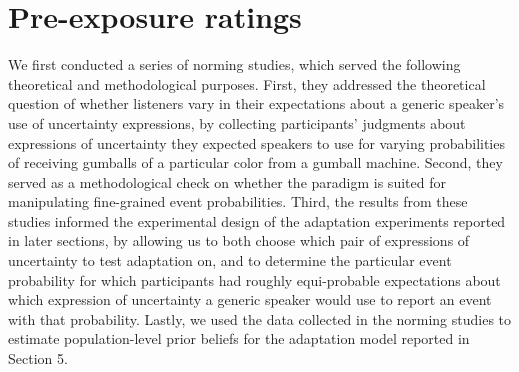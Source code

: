 \documentclass[lucida,biblatex]{sp} %
\newcommand{\sectionref}[1]{Section~\ref{#1}}
\begin{document}



\section{Pre-exposure ratings}
\label{sec:exp-norming}

We first conducted a series of norming studies, which served the following theoretical and methodological purposes.
First, they addressed the theoretical question of whether listeners vary in their expectations about
a generic speaker's use of uncertainty expressions, by collecting participants' judgments about expressions of uncertainty they expected speakers to use for varying probabilities of receiving gumballs of a particular color from a gumball machine. 
Second, they served as a methodological check on whether the paradigm is suited for manipulating fine-grained event probabilities. Third,  the results from these studies informed the experimental design of the adaptation experiments reported in later sections, by allowing us to both choose which pair of expressions of uncertainty to test adaptation on, and to determine the particular event probability for which participants had roughly equi-probable expectations about which expression of uncertainty a generic speaker would use to report an event with that probability. 
Lastly, we used the data collected in the norming studies to 
estimate population-level prior beliefs for the adaptation model reported in Section 5.
\end{document}
